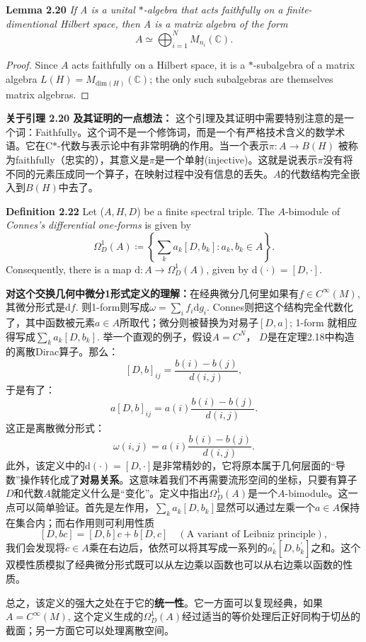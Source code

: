  \textbf{Lemma 2.20} \textit{If A is a unital $*$-algebra that acts faithfully on a finite-dimentional Hilbert space, then A is a matrix algebra of the form} 
 \[
 A\simeq\bigoplus_{i=1}^N M_{n_i}(\mathbb{C}). 
 \]
 \begin{proof}
    Since $A$ acts faithfully on a Hilbert space, it is a $*$-subalgebra of a matrix algebra $L(H)=M_{\text{dim}(H)}(\mathbb{C})$; the only such subalgebras are themselves matrix algebras.
 \end{proof}
 \textbf{关于引理 2.20 及其证明的一点想法：} 这个引理及其证明中需要特别注意的是一个词：Faithfully。这个词不是一个修饰词，而是一个有严格技术含义的数学术语。它在C$*$-代数与表示论中有非常明确的作用。当一个表示$\pi:A\rightarrow B(H)$ 被称为faithfully（忠实的），其意义是$\pi$是一个单射(injective)。这就是说表示$\pi$没有将不同的元素压成同一个算子，在映射过程中没有信息的丢失。$A$的代数结构完全嵌入到$B(H)$中去了。 

 \textbf{Definition 2.22} Let ($A, H, D$) be a finite spectral triple. The $A$-bimodule of \textit{Connes's differential one-forms} is given by 
 \[
 \Omega_D^1(A)\coloneqq\left\{\sum_ka_k[D, b_k]: a_k, b_k\in A\right\}.
 \]
 Consequently, there is a map $\text{d}: A\rightarrow \Omega_D^1(A)$, given by $\text{d}(\cdot)=[D,\cdot]$.

 \textbf{对这个交换几何中微分1形式定义的理解：}在经典微分几何里如果有$f\in C^{\infty}(M)$, 其微分形式是$\text{d}f$. 则1-form则写成$\omega=\sum_if_i\text{d}g_i$. Connes则把这个结构完全代数化了，其中函数被元素$a\in A$所取代；微分则被替换为对易子$[D,a]$; 1-form 就相应得写成$\sum_ka_k[D,b_k]$. 举一个直观的例子，假设$A=C^N$， $D$是在定理2.18中构造的离散Dirac算子。那么：
 \[
 [D,b]_{ij}=\frac{b(i)-b(j)}{d(i,j)},
 \]
 于是有了：
 \[
 a[D,b]_{ij}=a(i)\frac{b(i)-b(j)}{d(i,j)}.
 \]
 这正是离散微分形式：
 \[
 \omega(i,j)=a(i)\frac{b(i)-b(j)}{d(i,j)}.
 \]
 此外，该定义中的$\text{d}(\cdot)=[D,\cdot]$是非常精妙的，它将原本属于几何层面的``导数''操作转化成了\textbf{对易关系}。这意味着我们不再需要流形空间的坐标，只要有算子$D$和代数$A$就能定义什么是``变化''。定义中指出$\Omega_D^1(A)$是一个$A$-bimodule。这一点可以简单验证。首先是左作用，$\sum_ka_k[D,b_k]$显然可以通过左乘一个$a\in A$保持在集合内；而右作用则可利用性质
 \[
 [D, bc]=[D,b]c+b[D,c] \quad (\text{A variant of Leibniz principle}),
 \]
 我们会发现将$c\in A$乘在右边后，依然可以将其写成一系列的$a_k^{\prime}[D, b_k^{\prime}]$之和。这个双模性质模拟了经典微分形式既可以从左边乘以函数也可以从右边乘以函数的性质。

 总之，该定义的强大之处在于它的\textbf{统一性}。它一方面可以复现经典，如果$A=C^{\infty}(M)$, 这个定义生成的$\Omega_D^1(A)$经过适当的等价处理后正好同构于切丛的截面；另一方面它可以处理离散空间。

